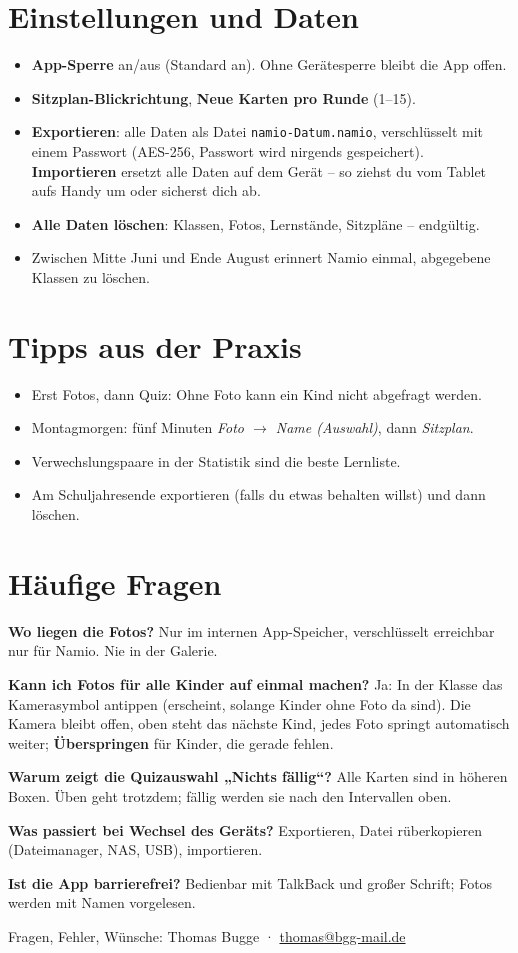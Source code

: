 \documentclass[11pt,a4paper]{article}
\newcommand{\ui}[1]{\textbf{#1}}
\begin{document}
\section{Einstellungen und Daten}
\begin{itemize}[nosep]
  \item \ui{App-Sperre} an/aus (Standard an). Ohne Gerätesperre bleibt die App offen.
  \item \ui{Sitzplan-Blickrichtung}, \ui{Neue Karten pro Runde} (1--15).
  \item \ui{Exportieren}: alle Daten als Datei \texttt{namio-Datum.namio}, verschlüsselt mit einem Passwort
        (AES-256, Passwort wird nirgends gespeichert). \ui{Importieren} ersetzt alle Daten auf dem Gerät --
        so ziehst du vom Tablet aufs Handy um oder sicherst dich ab.
  \item \ui{Alle Daten löschen}: Klassen, Fotos, Lernstände, Sitzpläne -- endgültig.
  \item Zwischen Mitte Juni und Ende August erinnert Namio einmal, abgegebene Klassen zu löschen.
\end{itemize}

\section{Tipps aus der Praxis}
\begin{itemize}[nosep]
  \item Erst Fotos, dann Quiz: Ohne Foto kann ein Kind nicht abgefragt werden.
  \item Montagmorgen: fünf Minuten \emph{Foto $\to$ Name (Auswahl)}, dann \emph{Sitzplan}.
  \item Verwechslungspaare in der Statistik sind die beste Lernliste.
  \item Am Schuljahresende exportieren (falls du etwas behalten willst) und dann löschen.
\end{itemize}

\section{Häufige Fragen}
\textbf{Wo liegen die Fotos?} Nur im internen App-Speicher, verschlüsselt erreichbar nur für Namio. Nie in der Galerie.

\textbf{Kann ich Fotos für alle Kinder auf einmal machen?} Ja: In der Klasse das Kamerasymbol antippen
(erscheint, solange Kinder ohne Foto da sind). Die Kamera bleibt offen, oben steht das nächste Kind,
jedes Foto springt automatisch weiter; \ui{Überspringen} für Kinder, die gerade fehlen.

\textbf{Warum zeigt die Quizauswahl „Nichts fällig“?} Alle Karten sind in höheren Boxen. Üben geht trotzdem;
fällig werden sie nach den Intervallen oben.

\textbf{Was passiert bei Wechsel des Geräts?} Exportieren, Datei rüberkopieren (Dateimanager, NAS, USB), importieren.

\textbf{Ist die App barrierefrei?} Bedienbar mit TalkBack und großer Schrift; Fotos werden mit Namen vorgelesen.

\bigskip
\noindent\small Fragen, Fehler, Wünsche: Thomas Bugge · \href{mailto:thomas@bgg-mail.de}{thomas@bgg-mail.de}
\end{document}
